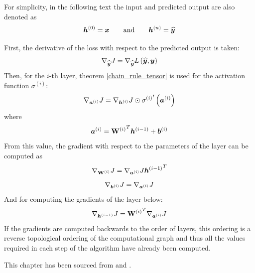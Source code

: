 \begin{example}
For simplicity, in the following text the input and predicted output are also denoted as
\[ \bm{h}^{(0)} = \bm{x} \qquad \text{and} \qquad \bm{h}^{(n)} = \widehat{\bm{y}} \]

First, the derivative of the loss with respect to the predicted output is taken:
\[ \nabla_{\widehat{\bm{y} }} J = \nabla_{\widehat{\bm{y}}} L \left( \widehat{\bm{y}}, \bm{y} \right) \]
Then, for the \( i \)-th layer, theorem \ref{chain_rule_tensor} is used for the activation function \( \sigma^{(i)} \):
\[ \nabla_{\bm{a}^{(i)}} J = \nabla_{\bm{h}^{(i)}} J \odot {\sigma^{(i)}}' \left( \bm{a}^{(i)} \right) \]
where 
\[ \bm{a}^{(i)} = {\mathbf{W}^{(i)}}^T \bm h^{(i - 1)} + \bm{b}^{(i)} \]
From this value, the gradient with respect to the parameters of the layer can be computed as
\[ \nabla_{\mathbf{W}^{(i)}} J = \nabla_{\bm{a}^{(i)}} J {\bm{h}^{(i - 1)}}^T \]
\[ \nabla_{\bm{b}^{(i)}} J = \nabla_{\bm{a}^{(i)}} J \]
And for computing the gradients of the layer below:
\[ \nabla_{\bm{h}^{(i - 1)}} J = {\mathbf{W}^{(i)}}^T \nabla_{\bm{a}^{(i)}} J \]
If the gradients are computed backwards to the order of layers, this ordering is a reverse topological ordering of the computational graph and thus all the values required in each step of the algorithm have already been computed.

This chapter has been sourced from \cite{goodfellow_deep_2016} and \cite{olah_calculus_2015}.
\end{example}
